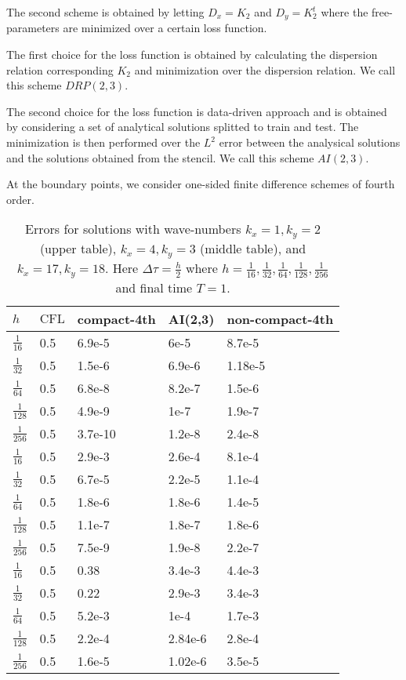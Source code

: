 \documentclass[12pt,reqno]{amsart}
\theoremstyle{definition}
\numberwithin{equation}{section}
\begin{document}
    The second scheme is obtained by letting $D_x=K_2$ and $D_y=K_2^t$ where the free-parameters  are minimized over a certain loss function.
    
    The first choice for the loss function is obtained by calculating the dispersion relation corresponding $K_2$ and minimization over the dispersion relation. We call this scheme 
    $DRP(2,3)$.
    
      The second choice for the loss function is data-driven approach and  is obtained by
    considering a set of analytical solutions splitted to train and test. The
       minimization  is then performed over the $L^2$ error between the analysical solutions and the solutions obtained from the stencil. We call this scheme $AI(2,3)$.
    
    At the boundary points, we consider one-sided finite difference schemes of fourth order.
		\begin{table} [h!]
			\centering
			\begin{tabular}{|p{0.7cm}|p{0.7cm}|p{4cm}|p{4cm}|p{4cm}|}
				\hline
				$h$ & $\mathrm{CFL}$ &compact-4th& AI(2,3)&non-compact-4th
				\\ [0.5ex] 
				\hline 
				$\frac{1}{16}$ & 0.5& 6.9e-5&  6e-5&8.7e-5 \\[0.5mm]
				$\frac{1}{32}$ & 0.5 &1.5e-6 &6.9e-6&1.18e-5 \\[0.5mm]
				$\frac{1}{64}$ & 0.5 & 6.8e-8 &8.2e-7& 1.5e-6 \\[0.5mm]
				$\frac{1}{128}$ & 0.5 &4.9e-9 & 1e-7&1.9e-7 \\[0.5mm]
				$\frac{1}{256}$ & 0.5& 3.7e-10 &1.2e-8&2.4e-8 \\[0.5mm]
				\hline \hline
				$\frac{1}{16}$ & 0.5& 2.9e-3&  2.6e-4&8.1e-4 \\[0.5mm]
				$\frac{1}{32}$ & 0.5 &6.7e-5 &2.2e-5&1.1e-4 \\[0.5mm]
				$\frac{1}{64}$ & 0.5 & 1.8e-6 &1.8e-6& 1.4e-5 \\[0.5mm]
				$\frac{1}{128}$ & 0.5 &1.1e-7 & 1.8e-7&1.8e-6 \\[0.5mm]
				$\frac{1}{256}$ & 0.5& 7.5e-9 &1.9e-8&2.2e-7 \\[0.5mm]
				\hline \hline
				$\frac{1}{16}$ & 0.5& 0.38& 3.4e-3 &4.4e-3\\[0.5mm]
				$\frac{1}{32}$ & 0.5 &0.22 &2.9e-3&3.4e-3 \\[0.5mm]
				$\frac{1}{64}$ & 0.5 & 5.2e-3 &1e-4& 1.7e-3\\[0.5mm]
				$\frac{1}{128}$ & 0.5 &2.2e-4 & 2.84e-6&2.8e-4\\[0.5mm]
				$\frac{1}{256}$ & 0.5& 1.6e-5 &1.02e-6& 3.5e-5\\[0.5mm]
				\hline
			\end{tabular}
			\caption{ Errors for solutions  with wave-numbers $k_x=1,k_y=2$ (upper table), $k_x=4,k_y=3$ (middle table),
				and  $k_x=17,k_y=18$.
				Here $\Delta \tau=\frac{h}{2}$ where $h=\frac{1}{16},\frac{1}{32},\frac{1}{64},
				\frac{1}{128}, \frac{1}{256}
				$
				and final time $T=1$.}
			\label{table:conv_rates_3}
		\end{table}
\end{document}
